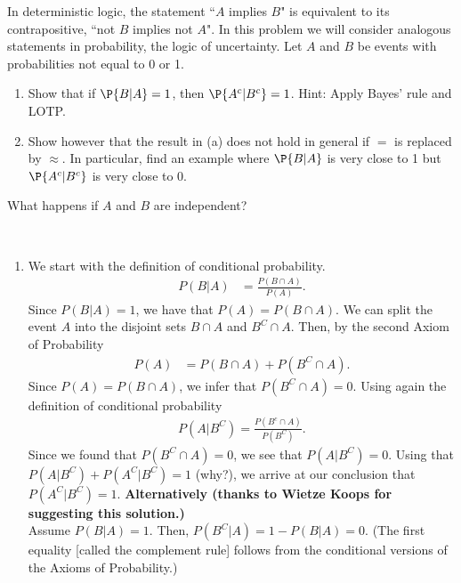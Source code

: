 

\setcounter{theorem}{11}
\begin{exercise}[BH.2.17] 
In deterministic logic, the statement ``$A$ implies $B$" is equivalent to its contrapositive, ``not $B$ implies not $A$". In this problem we will consider analogous statements in probability, the logic of uncertainty. Let $A$ and $B$ be events with probabilities not equal to 0 or 1.
	\begin{enumerate}
		\item Show that if $\P{B|A} = 1$, then $\P{A^c|B^c} = 1$. Hint: Apply Bayes' rule and LOTP.
		\item Show however that the result in (a) does not hold in general if $=$ is replaced by $\approx$. In particular, find an example where $\P{B|A}$ is very close to 1 but $\P{A^c|B^c}$ is very close to 0.
	\end{enumerate}
\begin{hint}
	What happens if $A$ and $B$ are independent?
\end{hint}
\begin{solution}~
	\begin{enumerate}
		\item We start with the definition of conditional probability.
		\begin{align*}
			P(B|A)& = \frac{P(B\cap A)}{P(A)}.
		\end{align*}
		Since $P(B|A)=1$, we have that $P(A) = P(B\cap A)$. We can split the event $A$ into the disjoint sets $B\cap A$ and $B^{C}\cap A$. Then, by the second Axiom of Probability
		\begin{align*}
			P(A) &= P(B\cap A) +P(B^{C}\cap A).
		\end{align*}
		Since  $P(A) = P(B\cap A)$, we infer that $P(B^{C}\cap A)=0$. Using again the definition of conditional probability
		\begin{align*}
			P(A|B^{C})=\frac{P(B^{c}\cap A)}{P(B^C)}.
		\end{align*}
		Since we found that $P(B^{C}\cap A)=0$, we see that $P(A|B^{C})=0$. Using that $P(A|B^{C}) + P(A^{C}|B^{C})=1$ (why?), we arrive at our conclusion that $P(A^{C}|B^{C})=1$. \newline\newline
		\textbf{Alternatively (thanks to Wietze Koops for suggesting this solution.)}\\
		Assume $P(B|A)=1$. Then, $P(B^{C}|A) = 1-P(B|A) = 0$. (The first equality [called the complement rule] follows from the conditional versions of the Axioms of Probability.)\\

\end{enumerate}
\end{solution}
\end{exercise}
